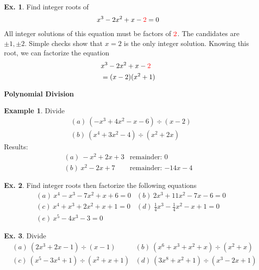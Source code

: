 \documentclass[10pt,a4paper]{book}
\newcommand{\red}[1]{\textcolor{red}{#1}}
\theoremstyle{definition}\newtheorem{definition}{Definition}
\theoremstyle{definition}\newtheorem{fact}{Fact}
\theoremstyle{definition}\newtheorem{ex}{Ex.}
\theoremstyle{definition}\newtheorem{project}{Project}
\theoremstyle{definition}\newtheorem{problem}{Problem}
\theoremstyle{definition}\newtheorem{example}{Example}
\numberwithin{theorem}{chapter}
\numberwithin{corollary}{chapter}
\numberwithin{assumption}{chapter}
\numberwithin{definition}{chapter}
\numberwithin{prop}{chapter}
\numberwithin{notation}{chapter}
\numberwithin{problem}{chapter}
\numberwithin{example}{chapter}
\numberwithin{fact}{chapter}
\numberwithin{ex}{chapter}
\begin{document}
	\begin{ex}
		Find integer roots of
		\begin{align*}
			x^3 - 2 x^2 + x - \red{2} = 0 
		\end{align*}
		All integer solutions of this equation must be factors of $\red{2}$. The candidates are $\pm 1, \pm 2$. Simple checks show that $x=2$ is the only integer solution. Knowing this root, we can factorize the equation
		\begin{align*}
			& x^3 - 2 x^2 + x - \red{2} \\
			& = (x-2)(x^2+1)            
		\end{align*}
	\end{ex}
	
	\textbf{Polynomial Division}
	\begin{example}
		Divide
		\begin{align*}
			& (a) \ (-x^3 + 4x^2 - x - 6) \div (x-2) \\
			& (b) \ (x^4 + 3x^2 - 4) \div (x^2 + 2x) 
		\end{align*}
		Results:
		\begin{align*}
			& (a) \  -x^2 + 2x + 3 &\text{remainder: 0} &                            \\
			& (b) \ x^2 - 2x + 7 &\text{remainder: $-14x-4$} &                            
		\end{align*}
	\end{example}
	
	\begin{ex}
		Find integer roots then factorize the following equations
		\begin{align*}
			& (a) \ x^4 - x^3 - 7x^2 + x + 6 = 0                  
			& (b) \ 2x^3 + 11 x^2 - 7 x - 6 = 0                   \\ 
			& (c) \ x^4 + x^3 + 2x^2 +x +1 = 0                    
			& (d) \ \frac{1}{4} x^3 - \frac{1}{4} x^2 - x + 1 = 0 \\
			& (e) \ x^5 - 4 x^3 - 3 = 0                           
		\end{align*}
	\end{ex}
	
	\begin{ex}
		Divide
		\begin{align*}
			& (a) \ (2x^3 + 2x -1) \div (x-1)            
			& (b) \ (x^6 + x^3 + x^2 + x) \div (x^2 + x) \\
			& (c) \ (x^5 - 3x^4 + 1) \div (x^2 + x + 1)  
			& (d) \ (3x^8 + x^2 + 1) \div (x^3 - 2x + 1) 
		\end{align*}
	\end{ex}
	
\end{document}
